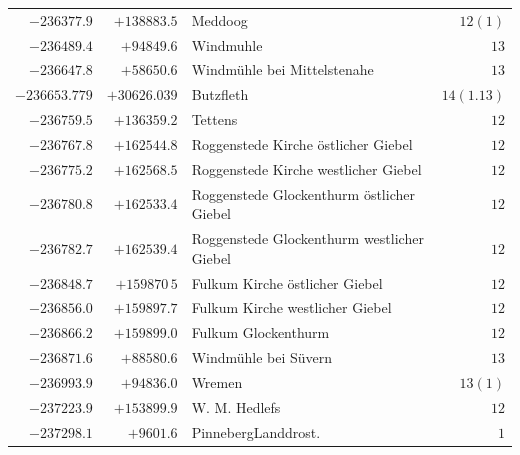 \begin{center}
\begin{tabular}{r|r|p{170pt}|r}
\(-236377.9\)&\(+138883.5\)&Meddoog&\(12(1)\)\\
\(-236489.4\)&\(+94849.6\)&Windmuhle&\(13\)\\
\(-236647.8\)&\(+58650.6\)&Windmühle bei Mittelstenahe&\(13\)\\
\(-236653.779\)&\(+30626.039\)&Butzfleth&\(14(1.13)\)\\
\(-236759.5\)&\(+136359.2\)&Tettens&\(12\)\\
\(-236767.8\)&\(+162544.8\)&Roggenstede Kirche östlicher Giebel&\(12\)\\
\(-236775.2\)&\(+162568.5\)&Roggenstede Kirche westlicher Giebel&\(12\)\\
\(-236780.8\)&\(+162533.4\)&Roggenstede Glockenthurm östlicher Giebel&\(12\)\\
\(-236782.7\)&\(+162539.4\)&Roggenstede Glockenthurm westlicher Giebel&\(12\)\\
\(-236848.7\)&\(+159870\,5\)&Fulkum Kirche östlicher Giebel&\(12\)\\
\(-236856.0\)&\(+159897.7\)&Fulkum Kirche westlicher Giebel&\(12\)\\
\(-236866.2\)&\(+159899.0\)&Fulkum Glockenthurm&\(12\)\\
\(-236871.6\)&\(+88580.6\)&Windmühle bei Süvern&\(13\)\\
\(-236993.9\)&\(+94836.0\)&Wremen&\(13(1)\)\\
\(-237223.9\)&\(+153899.9\)&W. M. Hedlefs&\(12\)\\
\(-237298.1\)&\(+9601.6\)&PinnebergLanddrost.&\(1\)\\
\hline\end{tabular}\endgroup\end{center}
